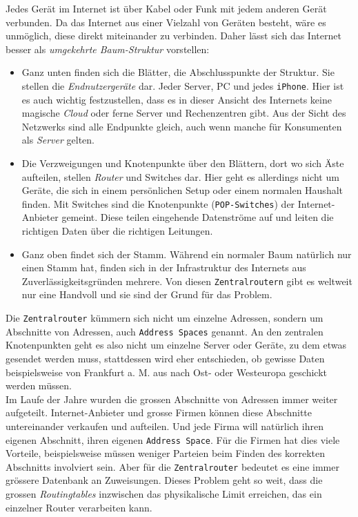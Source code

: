 \documentclass[a4paper,11pt,titlepage,twoside]{memoir}
\begin{document}
\noindent Jedes Gerät im Internet ist über Kabel oder Funk mit jedem
anderen Gerät verbunden. Da das Internet aus einer Vielzahl von
Geräten besteht, wäre es unmöglich, diese direkt miteinander zu
verbinden. Daher lässt sich das Internet besser als \emph{umgekehrte
Baum-Struktur} vorstellen:
\begin{itemize}
\item Ganz unten finden sich die Blätter, die Abschlusspunkte der
Struktur. Sie stellen die \emph{Endnutzergeräte} dar. Jeder Server, PC und
jedes \texttt{iPhone}. Hier ist es auch wichtig festzustellen, dass es in
dieser Ansicht des Internets keine magische \emph{Cloud} oder ferne Server
und Rechenzentren gibt. Aus der Sicht des Netzwerks sind alle
Endpunkte gleich, auch wenn manche für Konsumenten als \emph{Server}
gelten.
\item Die Verzweigungen und Knotenpunkte über den Blättern, dort wo sich
Äste aufteilen, stellen \emph{Router} und Switches dar. Hier geht es
allerdings nicht um Geräte, die sich in einem persönlichen Setup
oder einem normalen Haushalt finden. Mit Switches sind die
Knotenpunkte (\texttt{POP-Switches}) der Internet-Anbieter gemeint. Diese
teilen eingehende Datenströme auf und leiten die richtigen Daten
über die richtigen Leitungen.
\item Ganz oben findet sich der Stamm. Während ein normaler Baum natürlich
nur einen Stamm hat, finden sich in der Infrastruktur des Internets
aus Zuverlässigkeitsgründen mehrere. Von diesen \texttt{Zentralroutern} gibt
es weltweit nur eine Handvoll und sie sind der Grund für das
Problem.
\end{itemize}

\noindent Die \texttt{Zentralrouter} kümmern sich nicht um einzelne Adressen,
sondern um Abschnitte von Adressen, auch \texttt{Address Spaces} genannt. An
den zentralen Knotenpunkten geht es also nicht um einzelne Server oder
Geräte, zu dem etwas gesendet werden muss, stattdessen wird eher
entschieden, ob gewisse Daten beispielsweise von Frankfurt a. M. aus
nach Ost- oder Westeuropa geschickt werden müssen.\\

\noindent Im Laufe der Jahre wurden die grossen Abschnitte von
Adressen immer weiter aufgeteilt. Internet-Anbieter und grosse Firmen
können diese Abschnitte untereinander verkaufen und aufteilen. Und
jede Firma will natürlich ihren eigenen Abschnitt, ihren eigenen
\texttt{Address Space}. Für die Firmen hat dies viele Vorteile, beispielsweise
müssen weniger Parteien beim Finden des korrekten Abschnitts
involviert sein. Aber für die \texttt{Zentralrouter} bedeutet es eine immer
grössere Datenbank an Zuweisungen. Dieses Problem geht so weit, dass
die grossen \emph{Routingtables} inzwischen das physikalische Limit
erreichen, das ein einzelner Router verarbeiten kann.\\
\end{document}
